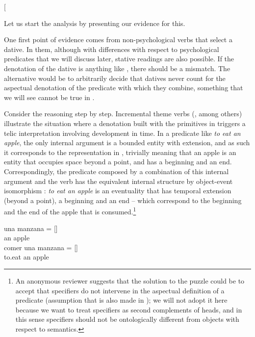 \documentclass[output=paper,colorlinks,citecolor=brown,nonflat]{./langscibook}
\begin{document}
\ea%
    \label{ex:fabregas:17}{}
    [
    \z

Let us start the analysis by presenting our evidence for this. 


One first point of evidence comes from non-psychological verbs that select a dative. In them, although with differences with respect to psychological predicates that we will discuss later, stative readings are also possible. If the denotation of the dative is anything like , there should be a mismatch. The alternative would be to arbitrarily decide that datives never count for the aspectual denotation of the predicate with which they combine, something that we will see cannot be true in .

Consider the reasoning step by step. Incremental theme verbs (\citealt{Tenny1987, Krifka1989}, among others) illustrate the situation where a denotation built with the primitives in  triggers a telic interpretation involving development in time. In a predicate like \textit{to eat an apple}, the only internal argument is a bounded entity with extension, and as such it corresponds to the representation in , trivially meaning that an apple is an entity that occupies space beyond a point, and has a beginning and an end. Correspondingly, the predicate  composed by a combination of this internal argument and the verb has the equivalent internal structure by object-event isomorphism \citep{Ramchand2008}: \textit{to eat an apple} is an eventuality that has temporal extension (beyond a point), a beginning and an end – which correspond to the beginning and the end of the apple that is consumed.\footnote{An anonymous reviewer suggests that the solution to the puzzle could be to accept that specifiers do not intervene in the aspectual definition of a predicate (assumption that is also made in \citealt{Ramchand2008}); we will not adopt it here because we want to treat specifiers as second complements of heads, and in this sense specifiers should not be ontologically different from objects with respect to semantics.} 

\ea%
    \label{ex:fabregas:18}
    \ea\label{ex:fabregas:18a}
    \gll    una manzana       =       [{\midline}]\\
            {an}   {apple}\\
    \ex\label{ex:fabregas:18b}
    \gll    comer una manzana  =      [{\midline}]\\
            {to.eat}  {an}   {apple}\\
    \z
\z
\end{document}
